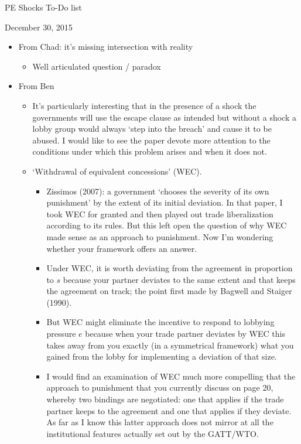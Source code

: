 \documentclass[12pt]{article}
\begin{document}
\begin{center}
PE Shocks To-Do list
\end{center}

December 30, 2015
\begin{itemize}
	\item From Chad: it's missing intersection with reality
		\begin{itemize}
			\item Well articulated question / paradox
		\end{itemize}
	\item From Ben
		\begin{itemize}
			\item It's particularly interesting that in the presence of a shock the governments will use the escape clause as intended but without a shock a lobby group would always `step into the breach' and cause it to be abused.  I would like to see the paper devote more attention to the conditions under which this problem arises and when it does not.
			\item `Withdrawal of equivalent concessions' (WEC).
				\begin{itemize}
					\item Zissimos (2007): a government `chooses the severity of its own punishment' by the extent of its initial deviation.  In that paper, I took WEC for granted and then played out trade liberalization according to its rules.  But this left open the question of why WEC made sense as an approach to punishment.  Now I'm wondering whether your framework offers an answer.
					\item Under WEC, it is worth deviating from the agreement in proportion to $s$ because your partner deviates to the same extent and that keeps the agreement on track; the point first made by Bagwell and Staiger (1990).
					\item But WEC might eliminate the incentive to respond to lobbying pressure $e$ because when your trade partner deviates by WEC this takes away from you exactly (in a symmetrical framework) what you gained from the lobby for implementing a deviation of that size.
					\item I would find an examination of WEC much more compelling that the approach to punishment that you currently discuss on page 20, whereby two bindings are negotiated: one that applies if the trade partner keeps to the agreement and one that applies if they deviate.  As far as I know this latter approach does not mirror at all the institutional features actually set out by the GATT/WTO.
				\end{itemize}
		\end{itemize}
\end{itemize}
\end{document}
